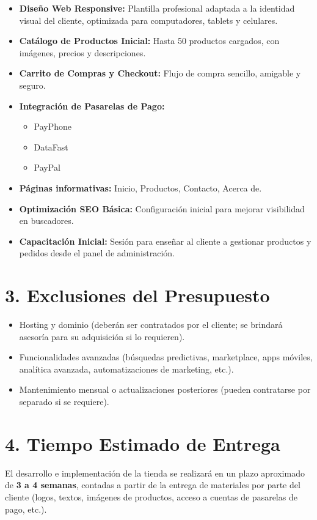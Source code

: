 \documentclass[12pt,a4paper]{article}
\begin{document}
\begin{itemize}
    \item \textbf{Diseño Web Responsive:} Plantilla profesional adaptada a la identidad visual del cliente, optimizada para computadores, tablets y celulares.
    \item \textbf{Catálogo de Productos Inicial:} Hasta 50 productos cargados, con imágenes, precios y descripciones.
    \item \textbf{Carrito de Compras y Checkout:} Flujo de compra sencillo, amigable y seguro.
    \item \textbf{Integración de Pasarelas de Pago:} 
    \begin{itemize}
        \item PayPhone
        \item DataFast
        \item PayPal
    \end{itemize}
    \item \textbf{Páginas informativas:} Inicio, Productos, Contacto, Acerca de.
    \item \textbf{Optimización SEO Básica:} Configuración inicial para mejorar visibilidad en buscadores.
    \item \textbf{Capacitación Inicial:} Sesión para enseñar al cliente a gestionar productos y pedidos desde el panel de administración.
\end{itemize}

\section*{3. Exclusiones del Presupuesto}
\begin{itemize}
    \item Hosting y dominio (deberán ser contratados por el cliente; se brindará asesoría para su adquisición si lo requieren).
    \item Funcionalidades avanzadas (búsquedas predictivas, marketplace, apps móviles, analítica avanzada, automatizaciones de marketing, etc.).
    \item Mantenimiento mensual o actualizaciones posteriores (pueden contratarse por separado si se requiere).
\end{itemize}

\section*{4. Tiempo Estimado de Entrega}
El desarrollo e implementación de la tienda se realizará en un plazo aproximado de \textbf{3 a 4 semanas}, contadas a partir de la entrega de materiales por parte del cliente (logos, textos, imágenes de productos, acceso a cuentas de pasarelas de pago, etc.).
\end{document}
